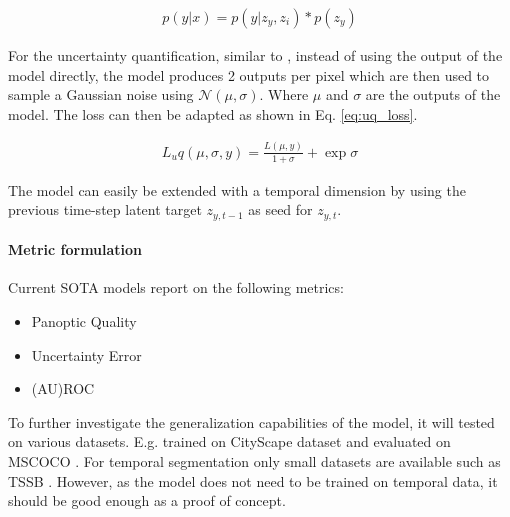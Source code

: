 \documentclass{article}
\begin{document}
\begin{align}
  p(y|x) = p(y|z_y, z_i) * p(z_y) \label{eq:LDMS}
\end{align}

For the uncertainty quantification, similar to \cite{tanno2021uncertainty,gasperini2023segmenting, van2020uncertainty}, instead of using the output of the model directly, the model produces 2 outputs per pixel which are then used to sample a Gaussian noise using $\mathcal{N}(\mu, \sigma)$. Where $\mu$ and $\sigma$ are the outputs of the model. The loss can then be adapted as shown in Eq. \ref{eq:uq_loss}.

\begin{align}
  L_uq(\mu, \sigma, y) = \frac{L(\mu, y)}{1 + \sigma} + \exp{\sigma} \label{eq:uq_loss}
\end{align}

The model can easily be extended with a temporal dimension by using the previous time-step latent target $z_{y, t-1}$ as seed for $z_{y, t}$.

\paragraph*{Metric formulation}
Current SOTA models report on the following metrics:
\begin{itemize}
  \item Panoptic Quality \cite{kirillov2019panoptic}
  \item Uncertainty Error \cite{miller2019evaluating}
  \item (AU)ROC \cite{miller2019evaluating}
\end{itemize}

To further investigate the generalization capabilities of the model, it will tested on various datasets. E.g. trained on CityScape \cite{cordts2016cityscapes} dataset and evaluated on MSCOCO \cite{cocodataset}. For temporal segmentation only small datasets are available such as TSSB \cite{clasp2021}. However, as the model does not need to be trained on temporal data, it should be good enough as a proof of concept.

\end{document}
